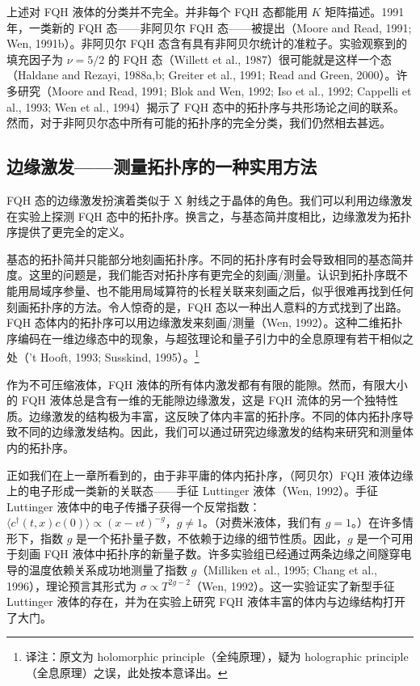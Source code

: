 上述对 FQH 液体的分类并不完全。并非每个 FQH 态都能用 $K$ 矩阵描述。1991 年，一类新的 FQH 态——非阿贝尔 FQH 态——被提出（Moore and Read, 1991; Wen, 1991b）。非阿贝尔 FQH 态含有具有非阿贝尔统计的准粒子。实验观察到的填充因子为 $\nu=5/2$ 的 FQH 态（Willett et al., 1987）很可能就是这样一个态（Haldane and Rezayi, 1988a,b; Greiter et al., 1991; Read and Green, 2000）。许多研究（Moore and Read, 1991; Blok and Wen, 1992; Iso et al., 1992; Cappelli et al., 1993; Wen et al., 1994）揭示了 FQH 态中的拓扑序与共形场论之间的联系。然而，对于非阿贝尔态中所有可能的拓扑序的完全分类，我们仍然相去甚远。

\subsection{边缘激发——测量拓扑序的一种实用方法}

\begin{keypoints}
\item FQH 态的边缘激发扮演着类似于 X 射线之于晶体的角色。我们可以利用边缘激发在实验上探测 FQH 态中的拓扑序。换言之，与基态简并度相比，边缘激发为拓扑序提供了更完全的定义。
\end{keypoints}

基态的拓扑简并只能部分地刻画拓扑序。不同的拓扑序有时会导致相同的基态简并度。这里的问题是，我们能否对拓扑序有更完全的刻画/测量。认识到拓扑序既不能用局域序参量、也不能用局域算符的长程关联来刻画之后，似乎很难再找到任何刻画拓扑序的方法。令人惊奇的是，FQH 态以一种出人意料的方式找到了出路。FQH 态体内的拓扑序可以用边缘激发来刻画/测量（Wen, 1992）。这种二维拓扑序编码在一维边缘态中的现象，与超弦理论和量子引力中的全息原理有若干相似之处（'t Hooft, 1993; Susskind, 1995）。\footnote{译注：原文为 holomorphic principle（全纯原理），疑为 holographic principle（全息原理）之误，此处按本意译出。}

作为不可压缩液体，FQH 液体的所有体内激发都有有限的能隙。然而，有限大小的 FQH 液体总是含有一维的无能隙边缘激发，这是 FQH 流体的另一个独特性质。边缘激发的结构极为丰富，这反映了体内丰富的拓扑序。不同的体内拓扑序导致不同的边缘激发结构。因此，我们可以通过研究边缘激发的结构来研究和测量体内的拓扑序。

正如我们在上一章所看到的，由于非平庸的体内拓扑序，（阿贝尔）FQH 液体边缘上的电子形成一类新的关联态——手征 Luttinger 液体（Wen, 1992）。手征 Luttinger 液体中的电子传播子获得一个反常指数：$\langle c^{\dagger}(t,x)c(0)\rangle\propto(x-vt)^{-g}$，$g\neq1$。（对费米液体，我们有 $g=1$。）在许多情形下，指数 $g$ 是一个拓扑量子数，不依赖于边缘的细节性质。因此，$g$ 是一个可用于刻画 FQH 液体中拓扑序的新量子数。许多实验组已经通过两条边缘之间隧穿电导的温度依赖关系成功地测量了指数 $g$（Milliken et al., 1995; Chang et al., 1996），理论预言其形式为 $\sigma\propto T^{2g-2}$（Wen, 1992）。这一实验证实了新型手征 Luttinger 液体的存在，并为在实验上研究 FQH 液体丰富的体内与边缘结构打开了大门。

